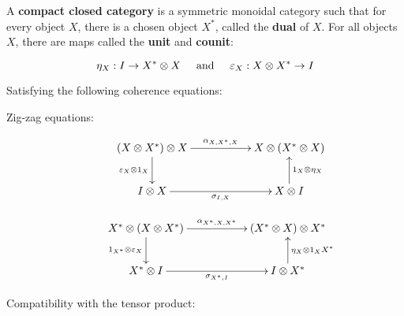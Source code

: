 \begin{definition}
A {\bf compact closed category} is a symmetric monoidal category such that for every object $X$, there is a chosen object $X^*$, called the {\bf dual} of $X$.
For all objects $X$, there are maps called the {\bf unit} and {\bf counit}:

$$
\eta_X:I\to X^* \otimes X\hspace*{.5cm}\text{and}\hspace*{.5cm} \epsilon_X:X\otimes X^*\to I 
$$



Satisfying the following coherence equations:

\begin{description}
\item[Zig-zag equations:]
$$
\xymatrix{
  (X\otimes X^*)\otimes X \ar[rr]^{\alpha_{X,X^*,X}}  \ar[d]_{\epsilon_X\otimes 1_X}
    & 
    & X\otimes(X^*\otimes X)
  \\I\otimes X \ar[rr]_{\sigma_{I,X}}
    &
    & X\otimes I \ar[u]_{1_X\otimes \eta_X}
}
$$

$$
\xymatrix{
  X^*\otimes ( X\otimes X^*) \ar[rr]^{\alpha_{X^*,X,X^*}}  \ar[d]_{1_{X^*}\otimes \epsilon_X}
    & 
    & (X^* \otimes X)\otimes X^*
  \\X^*\otimes I \ar[rr]_{\sigma_{X^*,I}}
    &
    & I\otimes X^* \ar[u]_{\eta_X\otimes 1_X{X^*}}
}
$$


\item[Compatibility with the tensor product:]\


\end{description}
\end{definition}
